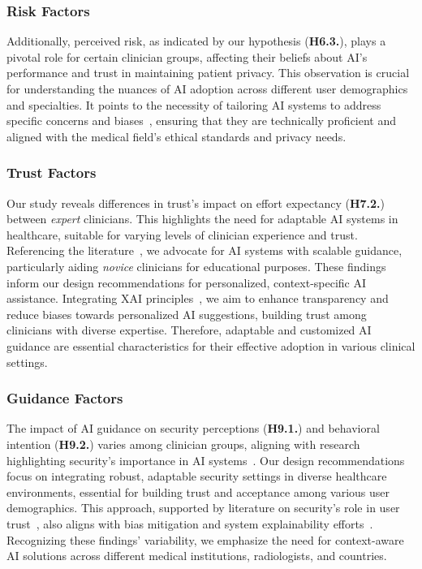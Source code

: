\subsubsection{Risk Factors}
\label{sec:chap004006001005}

\textcolor{revised}{Additionally, perceived risk, as indicated by our hypothesis ({\bf H6.3.}), plays a pivotal role for certain clinician groups, affecting their beliefs about \ac{AI}'s performance and trust in maintaining patient privacy.
This observation is crucial for understanding the nuances of \ac{AI} adoption across different user demographics and specialties.
It points to the necessity of tailoring \ac{AI} systems to address specific concerns and biases~\cite{Topol2019, 10.1145/3290605.3300831}, ensuring that they are technically proficient and aligned with the medical field's ethical standards and privacy needs.}

\subsubsection{Trust Factors}
\label{sec:chap004006001006}

\textcolor{revised}{Our study reveals differences in trust's impact on effort expectancy ({\bf H7.2.}) between {\it expert} clinicians.
This highlights the need for adaptable \ac{AI} systems in healthcare, suitable for varying levels of clinician experience and trust.
Referencing the literature~\cite{gunning2017explainable, 10.1145/3411764.3445717}, we advocate for \ac{AI} systems with scalable guidance, particularly aiding {\it novice} clinicians for educational purposes.
These findings inform our design recommendations for personalized, context-specific \ac{AI} assistance.
Integrating \ac{XAI} principles~\cite{10.1145/2939672.2939778}, we aim to enhance transparency and reduce biases towards personalized \ac{AI} suggestions, building trust among clinicians with diverse expertise.
Therefore, adaptable and customized \ac{AI} guidance are essential characteristics for their effective adoption in various clinical settings.}

\subsubsection{Guidance Factors}
\label{sec:chap004006001007}

\textcolor{revised}{The impact of \ac{AI} guidance on security perceptions ({\bf H9.1.}) and behavioral intention ({\bf H9.2.}) varies among clinician groups, aligning with research highlighting security's importance in \ac{AI} systems~\cite{MALAMATENIOU20211192}.
Our design recommendations focus on integrating robust, adaptable security settings in diverse healthcare environments, essential for building trust and acceptance among various user demographics.
This approach, supported by literature on security's role in user trust~\cite{Amann2020}, also aligns with bias mitigation and system explainability efforts~\cite{SHIN2021102551}.
Recognizing these findings' variability, we emphasize the need for context-aware \ac{AI} solutions across different medical institutions, radiologists, and countries.}

